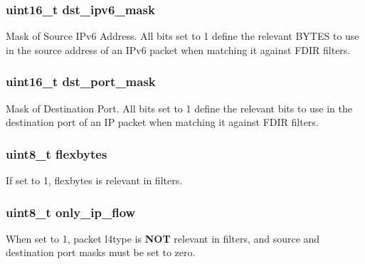 \subsubsection[{dst\+\_\+ipv6\+\_\+mask}]{\setlength{\rightskip}{0pt plus 5cm}uint16\+\_\+t dst\+\_\+ipv6\+\_\+mask}\label{structrte__fdir__masks_ab85d32df5f720c359b18cca10aa7cda2}
Mask of Source I\+Pv6 Address. All bits set to 1 define the relevant B\+Y\+T\+E\+S to use in the source address of an I\+Pv6 packet when matching it against F\+D\+I\+R filters. \hypertarget{structrte__fdir__masks_a8c191b0996b359fb0012f86e0233abbc}{}
\subsubsection[{dst\+\_\+port\+\_\+mask}]{\setlength{\rightskip}{0pt plus 5cm}uint16\+\_\+t dst\+\_\+port\+\_\+mask}\label{structrte__fdir__masks_a8c191b0996b359fb0012f86e0233abbc}
Mask of Destination Port. All bits set to 1 define the relevant bits to use in the destination port of an I\+P packet when matching it against F\+D\+I\+R filters. \hypertarget{structrte__fdir__masks_a5484aba2cc7d3656f356317814cbb560}{}
\subsubsection[{flexbytes}]{\setlength{\rightskip}{0pt plus 5cm}uint8\+\_\+t flexbytes}\label{structrte__fdir__masks_a5484aba2cc7d3656f356317814cbb560}
If set to 1, flexbytes is relevant in filters. \hypertarget{structrte__fdir__masks_a610a3904e79a424b5b4d95b6e955ff75}{}
\subsubsection[{only\+\_\+ip\+\_\+flow}]{\setlength{\rightskip}{0pt plus 5cm}uint8\+\_\+t only\+\_\+ip\+\_\+flow}\label{structrte__fdir__masks_a610a3904e79a424b5b4d95b6e955ff75}
When set to 1, packet l4type is {\bfseries N\+O\+T} relevant in filters, and source and destination port masks must be set to zero. \hypertarget{structrte__fdir__masks_a4ad06096e04ef1ca4c5b99fcf264915d}{}

